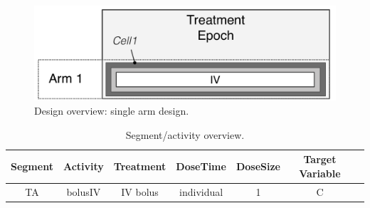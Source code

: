 \begin{figure}[ht!]
\centering
\includegraphics[width=0.7\linewidth]{pics/OneArmOneEpoch_IV}
\caption{Design overview: single arm design.}
\label{fig:1Arm1Epoch_RibbaDesign}
\end{figure}


\begin{table}[htdp!]
\begin{center}
\begin{tabular}{ccccccc}
\hline
Segment&Activity & Treatment & DoseTime & DoseSize & Target Variable \\
\hline
TA& bolusIV &  IV bolus & individual & 1 & C \\
\hline
\end{tabular}
\end{center}
\caption{Segment/activity overview.}
\label{tab:segementActivity_Ribba}
\end{table}

